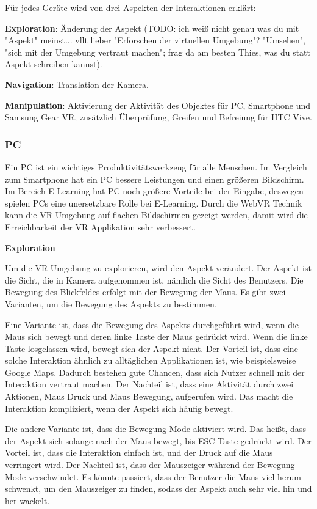  Für jedes Geräte wird von drei Aspekten der Interaktionen erklärt:
 
 \textbf{Exploration}: Änderung der Aspekt (TODO: ich weiß nicht genau was du mit "Aspekt" meinst... vllt lieber "Erforschen der virtuellen Umgebung"? "Umsehen", "sich mit der Umgebung vertraut machen"; frag da am besten Thies, was du statt Aspekt schreiben kannst).
 
 \textbf{Navigation}: Translation der Kamera.
 
 \textbf{Manipulation}: Aktivierung der Aktivität des Objektes für PC, Smartphone und Samsung Gear VR, zusätzlich Überprüfung, Greifen und Befreiung für HTC Vive.

 \subsubsection{PC}
 Ein PC ist ein wichtiges Produktivitätswerkzeug für alle Menschen. Im Vergleich zum Smartphone hat ein PC bessere Leistungen und einen größeren Bildschirm. Im Bereich E-Learning hat PC noch größere Vorteile bei der Eingabe, deswegen spielen PCs eine unersetzbare Rolle bei E-Learning. Durch die WebVR Technik kann die VR Umgebung auf flachen Bildschirmen gezeigt werden, damit wird die Erreichbarkeit der VR Applikation sehr verbessert. 
 
  \textbf{Exploration}
  
  Um die VR Umgebung zu explorieren, wird den Aspekt verändert. Der Aspekt ist die Sicht, die in Kamera aufgenommen ist, nämlich die Sicht des Benutzers. Die Bewegung des Blickfeldes erfolgt mit der Bewegung der Maus. Es gibt zwei Varianten, um die Bewegung des Aspekts zu bestimmen.
  
  Eine Variante ist, dass die Bewegung des Aspekts durchgeführt wird, wenn die Maus sich bewegt und deren linke Taste der Maus gedrückt wird. Wenn die linke Taste losgelassen wird, bewegt sich der Aspekt nicht. Der Vorteil ist, dass eine solche Interaktion ähnlich zu alltäglichen Applikationen ist, wie beispielsweise Google Maps. Dadurch bestehen gute Chancen, dass sich Nutzer schnell mit der Interaktion vertraut machen. Der Nachteil ist, dass eine Aktivität durch zwei Aktionen, Maus Druck und Maus Bewegung, aufgerufen wird. Das macht die Interaktion kompliziert, wenn der Aspekt sich häufig bewegt.
  
  Die andere Variante ist, dass die Bewegung Mode aktiviert wird. Das heißt, dass der Aspekt sich solange nach der Maus bewegt, bis ESC Taste gedrückt wird. Der Vorteil ist, dass die Interaktion einfach ist, und der Druck auf die Maus verringert wird. Der Nachteil ist, dass der Mauszeiger während der Bewegung Mode verschwindet. Es könnte passiert, dass der Benutzer die Maus viel herum schwenkt, um den Mauszeiger zu finden, sodass der Aspekt auch sehr viel hin und her wackelt.
  
